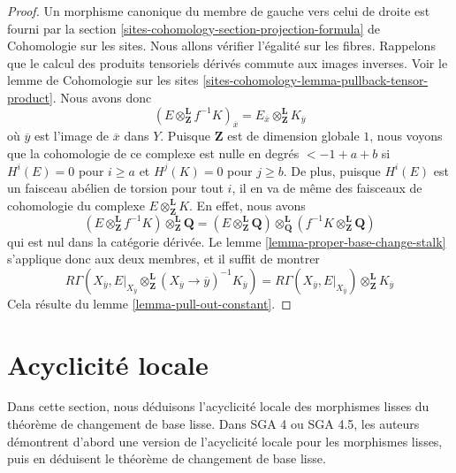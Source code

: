 \begin{proof}
Un morphisme canonique du membre de gauche vers celui de droite est fourni par la
section \ref{sites-cohomology-section-projection-formula} de Cohomologie sur les sites.
Nous allons vérifier l'égalité sur les fibres.
Rappelons que le calcul des produits tensoriels dérivés commute aux images inverses.
Voir le lemme de Cohomologie sur les sites
\ref{sites-cohomology-lemma-pullback-tensor-product}.
Nous avons donc
$$
(E \otimes_\mathbf{Z}^\mathbf{L} f^{-1}K)_{\overline{x}}
=
E_{\overline{x}} \otimes_\mathbf{Z}^\mathbf{L} K_{\overline{y}}
$$
où $\overline{y}$ est l'image de $\overline{x}$ dans $Y$.
Puisque $\mathbf{Z}$ est de dimension globale $1$, nous voyons que
la cohomologie de ce complexe est nulle en degrés $< - 1 + a + b$
si $H^i(E) = 0$ pour $i \geq a$ et $H^j(K) = 0$ pour $j \geq b$.
De plus, puisque $H^i(E)$ est un faisceau abélien
de torsion pour tout $i$, il en va de même des faisceaux de cohomologie
du complexe $E \otimes_\mathbf{Z}^\mathbf{L} K$.
En effet, nous avons
$$
(E \otimes_\mathbf{Z}^\mathbf{L} f^{-1}K)
\otimes_{\mathbf{Z}}^\mathbf{L} \mathbf{Q} =
(E \otimes_\mathbf{Z}^\mathbf{L} \mathbf{Q})
\otimes_{\mathbf{Q}}^\mathbf{L}
(f^{-1}K \otimes_{\mathbf{Z}}^\mathbf{L} \mathbf{Q})
$$
qui est nul dans la catégorie dérivée.
Le lemme \ref{lemma-proper-base-change-stalk} s'applique donc
aux deux membres, et il suffit de montrer
$$
R\Gamma(X_{\overline{y}},
E|_{X_{\overline{y}}} \otimes_\mathbf{Z}^\mathbf{L}
(X_{\overline{y}} \to \overline{y})^{-1}K_{\overline{y}}) =
R\Gamma(X_{\overline{y}},
E|_{X_{\overline{y}}}) \otimes_\mathbf{Z}^\mathbf{L} K_{\overline{y}}
$$
Cela résulte du lemme \ref{lemma-pull-out-constant}.
\end{proof}








\section{Acyclicité locale}
\label{section-local-acyclicity}

\noindent
Dans cette section, nous déduisons l'acyclicité locale des morphismes lisses
du théorème de changement de base lisse. Dans SGA 4 ou SGA 4.5, les auteurs
démontrent d'abord une version de l'acyclicité locale pour les morphismes lisses,
puis en déduisent le théorème de changement de base lisse.

